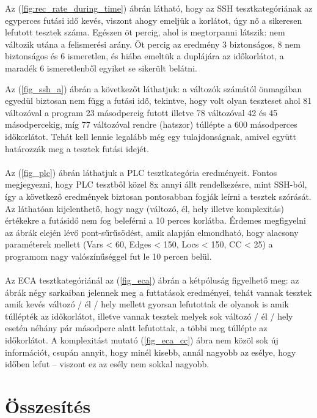 Az (\ref{fig:rec_rate_during_time}) ábrán látható, hogy az SSH tesztkategóriának az egyperces futási idő kevés, viszont ahogy emeljük a korlátot, úgy nő a sikeresen lefutott tesztek száma. Egészen öt percig, ahol is megtorpanni látszik: nem változik utána a felismerési arány. Öt percig az eredmény 3 biztonságos, 8 nem biztonságos és 6 ismeretlen, és hiába emeltük a duplájára az időkorlátot, a maradék 6 ismeretlenből egyiket se sikerült belátni. 

Az (\ref{fig_ssh_a}) ábrán a következőt láthatjuk: a változók számától önmagában egyedül biztosan nem függ a futási idő, tekintve, hogy volt olyan teszteset ahol 81 változóval a program 23 másodpercig futott illetve 78 változóval 42 és 45 másodpercekig, míg 77 változóval rendre (hatszor) túllépte a 600 másodperces időkorlátot. Tehát kell lennie legalább még egy tulajdonságnak, amivel együtt határozzák meg a tesztek futási idejét.
\\
\\
Az (\ref{fig_plc}) ábrán láthatjuk a PLC tesztkategória eredményeit. Fontos megjegyezni, hogy PLC tesztből közel 8x annyi állt rendelkezésre, mint SSH-ból, így a következő eredmények biztosan pontosabban fogják leírni a tesztek szórását. Az láthatóan kijelenthető, hogy nagy (változó, él, hely illetve komplexitás) értékekre a futásidő nem fog beleférni a 10 perces korlátba. Érdemes megfigyelni az ábrák elején lévő pont-sűrűsödést, amik alapján elmondható, hogy alacsony paraméterek mellett (Vars < 60, Edges < 150, Locs < 150, CC < 25) a programom nagy valószínűséggel fut le 10 percen belül. 
\\
\\
Az ECA tesztkategóriánál az (\ref{fig_eca}) ábrán a kétpóluság figyelhető meg: az ábrák négy sarkaiban jelennek meg a futtatások eredményei, tehát vannak tesztek amik kevés változó / él / hely mellett gyorsan lefutottak de olyanok is amik túllépték az időkorlátot, illetve vannak tesztek melyek sok változó / él / hely esetén néhány pár másodperc alatt lefutottak, a többi meg túllépte az időkorlátot. A komplexitást mutató (\ref{fig_eca_cc}) ábra nem közöl sok új információt, csupán annyit, hogy minél kisebb, annál nagyobb az esélye, hogy időben lefut -- viszont ez az esély nem sokkal nagyobb.

\clearpage

\section{Összesítés}
\label{sec:osszesites}

